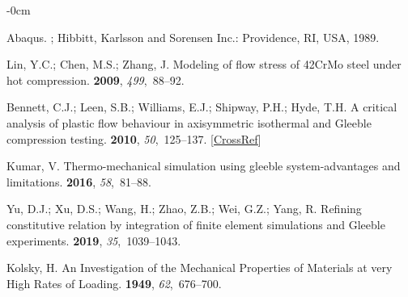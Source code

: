 \documentclass[algorithms,article,accept,pdftex,oneauthor]{Definitions/mdpi}
\begin{document}
\begin{adjustwidth}{-\extralength}{0cm}



\begin{thebibliography}{999}

Abaqus.
; Hibbitt, Karlsson and Sorensen Inc.: Providence, RI, USA, 1989. 


Lin, Y.C.; Chen, M.S.; Zhang, J.
\newblock Modeling of flow stress of {42CrMo} steel under hot compression.
 {\bf 2009}, {\em
499},~88--92.

 Bennett, C.J.; Leen, S.B.; Williams, E.J.; Shipway, P.H.; Hyde, T.H.
\newblock A critical analysis of plastic flow behaviour in axisymmetric
isothermal and {Gleeble} compression testing.
 {\bf 2010}, {\em 50},~125--137. [\href{http://dx.doi.org/10.1016/j.commatsci.2010.07.016}{CrossRef}]

Kumar, V.
\newblock Thermo-mechanical simulation using gleeble system-advantages and
limitations.
 {\bf 2016}, {\em
58},~81--88.

Yu, D.J.; Xu, D.S.; Wang, H.; Zhao, Z.B.; Wei, G.Z.; Yang, R.
\newblock Refining constitutive relation by integration of finite element
simulations and {Gleeble} experiments.
 {\bf 2019}, {\em
35},~1039--1043.

Kolsky, H.
\newblock An {Investigation} of the {Mechanical} {Properties} of {Materials} at
very {High} {Rates} of {Loading}.
 {\bf 1949}, {\em
62},~676--700.


\end{thebibliography}
\end{adjustwidth}
\end{document}
